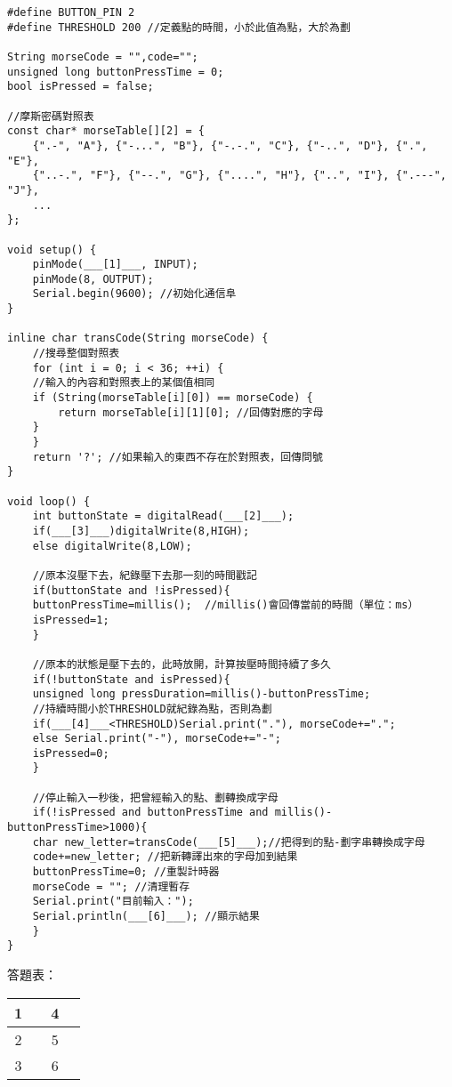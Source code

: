 \documentclass[12pt,a4paper]{article}
\begin{document}
\begin{lstlisting}
#define BUTTON_PIN 2
#define THRESHOLD 200 //定義點的時間，小於此值為點，大於為劃

String morseCode = "",code="";
unsigned long buttonPressTime = 0;
bool isPressed = false;

//摩斯密碼對照表
const char* morseTable[][2] = {
    {".-", "A"}, {"-...", "B"}, {"-.-.", "C"}, {"-..", "D"}, {".", "E"},
    {"..-.", "F"}, {"--.", "G"}, {"....", "H"}, {"..", "I"}, {".---", "J"},
    ...
};

void setup() {
    pinMode(___[1]___, INPUT);
    pinMode(8, OUTPUT);
    Serial.begin(9600); //初始化通信阜
}

inline char transCode(String morseCode) {
    //搜尋整個對照表
    for (int i = 0; i < 36; ++i) {
    //輸入的內容和對照表上的某個值相同
    if (String(morseTable[i][0]) == morseCode) {
        return morseTable[i][1][0]; //回傳對應的字母
    }
    }
    return '?'; //如果輸入的東西不存在於對照表，回傳問號
}

void loop() {
    int buttonState = digitalRead(___[2]___);
    if(___[3]___)digitalWrite(8,HIGH);
    else digitalWrite(8,LOW);

    //原本沒壓下去，紀錄壓下去那一刻的時間戳記
    if(buttonState and !isPressed){
    buttonPressTime=millis();  //millis()會回傳當前的時間（單位：ms）
    isPressed=1;
    }
    
    //原本的狀態是壓下去的，此時放開，計算按壓時間持續了多久
    if(!buttonState and isPressed){
    unsigned long pressDuration=millis()-buttonPressTime;
    //持續時間小於THRESHOLD就紀錄為點，否則為劃
    if(___[4]___<THRESHOLD)Serial.print("."), morseCode+=".";
    else Serial.print("-"), morseCode+="-";
    isPressed=0;
    }
    
    //停止輸入一秒後，把曾經輸入的點、劃轉換成字母
    if(!isPressed and buttonPressTime and millis()-buttonPressTime>1000){
    char new_letter=transCode(___[5]___);//把得到的點-劃字串轉換成字母
    code+=new_letter; //把新轉譯出來的字母加到結果
    buttonPressTime=0; //重製計時器
    morseCode = ""; //清理暫存
    Serial.print("目前輸入：");
    Serial.println(___[6]___); //顯示結果
    }
}
\end{lstlisting}

答題表：
\begin{table}[h!]
\centering
\begin{tabular}{|c|p{7cm}|c|p{7cm}|}
\hline
1 &  & 4 & \\ \hline
2 &  & 5 & \\ \hline
3 &  & 6 & \\ \hline
\end{tabular}
\end{table}
\end{document}
